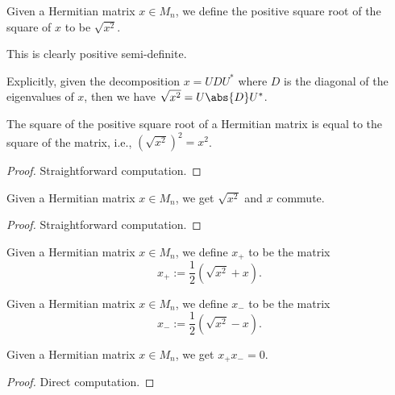  \begin{definition}\label{Matrix.IsHermitian.sqSqrt}\leanok
  Given a Hermitian matrix $x\in M_n$, we define the positive square root of the square of $x$ to be $\sqrt{x^2}$.

  This is clearly positive semi-definite.

  Explicitly, given the decomposition $x=UDU^*$ where $D$ is the diagonal of the eigenvalues of $x$, then we have $\sqrt{x^2}=U\abs{D}U^*$.
 \end{definition}
 
 \begin{lemma}\label{Matrix.IsHermitian.sqSqrt_sq}
  \leanok
  The square of the positive square root of a Hermitian matrix is equal to the square of the matrix, i.e., $\left(\sqrt{x^2}\right)^2=x^2$.
 \end{lemma}
 \begin{proof}\leanok
  Straightforward computation.
 \end{proof}

 \begin{corollary}\label{Matrix.IsHermitian.commute_sqSqrt}
  \leanok
  Given a Hermitian matrix $x\in M_n$, we get $\sqrt{x^2}$ and $x$ commute.
 \end{corollary}
 \begin{proof}\leanok
  Straightforward computation.
 \end{proof}

 \begin{definition}\label{posSemidefDecomposition_left}
  \leanok
  Given a Hermitian matrix $x\in M_n$, we define $x_+$ to be the matrix \[x_+:= \frac{1}{2}(\sqrt{x^2} + x).\]
 \end{definition}
 \begin{definition}\label{posSemidefDecomposition_right}
  \leanok
  Given a Hermitian matrix $x\in M_n$, we define $x_-$ to be the matrix \[x_-:= \frac{1}{2}(\sqrt{x^2} - x).\]
 \end{definition}

 \begin{lemma}\label{posSemidefDecomposition_left_mul_right}
  \leanok
  Given a Hermitian matrix $x\in M_n$, we get $x_+x_-=0$.
 \end{lemma}
 \begin{proof}\leanok
  Direct computation.
 \end{proof}

